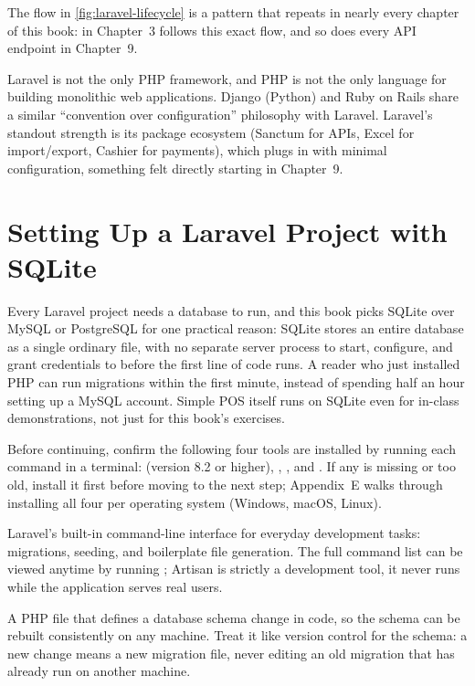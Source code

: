 The flow in \cref{fig:laravel-lifecycle} is a pattern that repeats in
nearly every chapter of this book:  in Chapter~3 follows this
exact flow, and so does every API endpoint in Chapter~9.

\begin{notebox}
Laravel is not the only PHP framework, and PHP is not the only language for
building monolithic web applications. Django (Python) and Ruby on Rails
share a similar ``convention over configuration'' philosophy with Laravel.
Laravel's standout strength is its package ecosystem
(Sanctum for APIs, Excel for import/export, Cashier for payments), which
plugs in with minimal configuration, something felt directly starting in
Chapter~9.
\end{notebox}

\section{Setting Up a Laravel Project with SQLite}
\label{sec:arsitektur-web-modern-2}

Every Laravel project needs a database to run, and this book picks SQLite
over MySQL or PostgreSQL for one practical reason: SQLite stores an entire
database as a single ordinary file, with no separate server process to
start, configure, and grant credentials to before the first line of code
runs. A reader who just installed PHP can run migrations within the first
minute, instead of spending half an hour setting up a MySQL account. Simple
POS itself runs on SQLite even for in-class demonstrations, not just for
this book's exercises.

\begin{tipbox}
Before continuing, confirm the following four tools are installed by
running each command in a terminal:  (version 8.2 or
higher), , , and . If
any is missing or too old, install it first before moving to the next
step; Appendix~E walks through installing all four per operating system
(Windows, macOS, Linux).
\end{tipbox}

\begin{istilahpenting}
\begin{description}[leftmargin=0pt,style=nextline]
  \item[Artisan] Laravel's built-in command-line interface for everyday development tasks: migrations, seeding, and boilerplate file generation. The full command list can be viewed anytime by running ; Artisan is strictly a development tool, it never runs while the application serves real users.
  \item[Migration] A PHP file that defines a database schema change in code, so the schema can be rebuilt consistently on any machine. Treat it like version control for the schema: a new change means a new migration file, never editing an old migration that has already run on another machine.
\end{description}
\end{istilahpenting}

